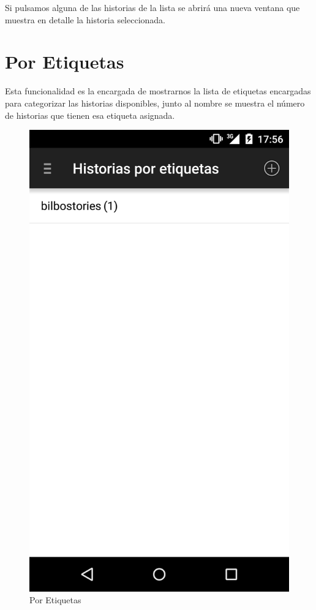 \documentclass[11pt,a4paper, titlepage]{article}
\begin{document}
	Si pulsamos alguna de las historias de la lista se abrirá una nueva ventana que muestra en detalle la historia seleccionada.
	
	\section[Por Etiquetas]{Por Etiquetas}
	
	Esta funcionalidad es la encargada de mostrarnos la lista de etiquetas encargadas para categorizar las historias disponibles, junto al nombre se muestra el número de historias que tienen esa etiqueta asignada.
	
	\begin{figure}[hbtp]
		\centering
		\includegraphics[scale = 0.25 ]{img/6}
		\caption{Por Etiquetas}
		\label{p1}
	\end{figure}
	
\end{document}

